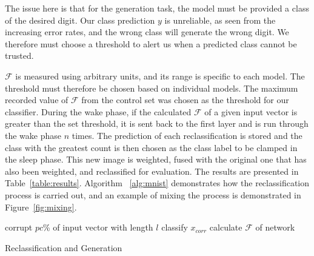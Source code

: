 \documentclass{report}
\begin{document}
The issue here is that for the generation task, the model must be provided a class of the desired digit. Our class prediction $y$ is unreliable, as seen from the increasing error rates, and the wrong class will generate the wrong digit. We therefore must choose a threshold to alert us when a predicted class cannot be trusted.


$\mathcal{F}$ is measured using arbitrary units, and its range is specific to each model. The threshold must therefore be chosen based on individual models. The maximum recorded value of $\mathcal{F}$ from the control set was chosen as the threshold for our classifier. During the wake phase, if the calculated $\mathcal{F}$ of a given input vector is greater than the set threshold, it is sent back to the first layer and is run through the wake phase $n$ times. The prediction of each reclassification is stored and the class with the greatest count is then chosen as the class label to be clamped in the sleep phase. This new image is weighted, fused with the original one that has also been weighted, and reclassified for evaluation. The results are presented in Table~\ref{table:results}. Algorithm ~\ref{alg:mnist} demonstrates how the reclassification process is carried out, and an example of mixing the process is demonstrated in Figure~\ref{fig:mixing}.

\smallskip

\begin{algorithm}[H]
 	corrupt $pc$\% of input vector with length $l$\;
	classify $x_{corr}$\;
	calculate $\mathcal{F}$ of network\;
	\caption{Reclassification and Generation}
	\label{alg:mnist}
\end{algorithm}

\smallskip
\end{document}
